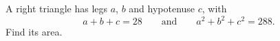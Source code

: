 A right triangle has legs $a$, $b$ and hypotenuse $c$, with
\[
a+b+c=28\qquad\text{and}\qquad a^2+b^2+c^2=288 .
\]
Find its area.
